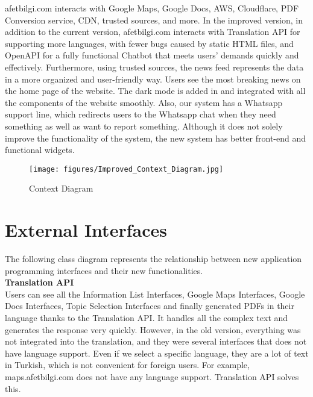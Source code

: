 \documentclass[listof=nochaptergap]{report}
\begin{document}
afetbilgi.com interacts with Google Maps, Google Docs, AWS, Cloudflare, PDF Conversion service, CDN, trusted sources, and more. In the improved version, in addition to the current version, afetbilgi.com interacts with Translation API for supporting more languages, with fewer bugs caused by static HTML files, and OpenAPI for a fully functional Chatbot that meets users' demands quickly and effectively. Furthermore, using trusted sources, the news feed represents the data in a more organized and user-friendly way. Users see the most breaking news on the home page of the website. The dark mode is added in and integrated with all the components of the website smoothly. Also, our system has a Whatsapp support line, which redirects users to the Whatsapp chat when they need something as well as want to report something. Although it does not solely improve the functionality of the system, the new system has better front-end and functional widgets.

        \begin{center}
            \begin{figure}[H]
                \centering
                \texttt{[image: figures/Improved\_Context\_Diagram.jpg]}
                \caption{Context Diagram} 
                \label{fig:figure1}
            \end{figure}
        \end{center}

\section{External Interfaces}

The following class diagram represents the relationship between new application programming interfaces and their new functionalities. \\

\textbf{Translation API} \\


Users can see all the Information List Interfaces, Google Maps Interfaces, Google Docs Interfaces, Topic Selection Interfaces and finally generated PDFs in their language thanks to the Translation API. It handles all the complex text and generates the response very quickly. However, in the old version, everything was not integrated into the translation, and they were several interfaces that does not have language support. Even if we select a specific language, they are a lot of text in Turkish, which is not convenient for foreign users. For example, maps.afetbilgi.com does not have any language support. Translation API solves this. \\
\end{document}
